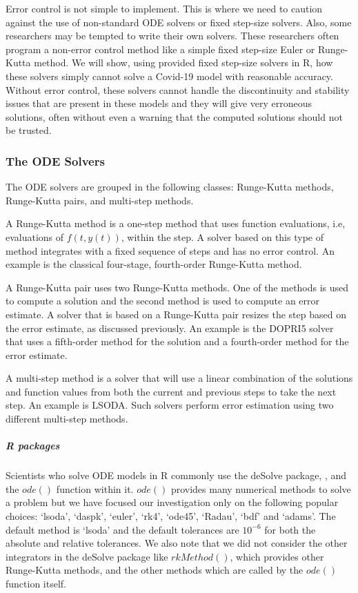 Error control is not simple to implement. This is where we need to caution against the use of non-standard ODE solvers or fixed step-size solvers. Also, some researchers may be tempted to write their own solvers. These researchers often program a non-error control method like a simple fixed step-size Euler or Runge-Kutta method. We will show, using provided fixed step-size solvers in R, how these solvers simply cannot solve a Covid-19 model with reasonable accuracy. Without error control, these solvers cannot handle the discontinuity and stability issues that are present in these models and they will give very erroneous solutions, often without even a warning that the computed solutions should not be trusted.

\subsubsection{The ODE Solvers}
\label{subsection:numerical_software_used}
The ODE solvers are grouped in the following classes: Runge-Kutta methods, Runge-Kutta pairs, and multi-step methods.

A Runge-Kutta method is a one-step method that uses function evaluations, i.e, evaluations of $f(t, y(t))$, within the step. A solver based on this type of method integrates with a fixed sequence of steps and has no error control. An example is the classical four-stage, fourth-order Runge-Kutta method.

A Runge-Kutta pair uses two Runge-Kutta methods. One of the methods is used to compute a solution and the second method is used to compute an error estimate. A solver that is based on a Runge-Kutta pair resizes the step based on the error estimate, as discussed previously. An example is the DOPRI5 solver that uses a fifth-order method for the solution and a fourth-order method for the error estimate.

A multi-step method is a solver that will use a linear combination of the solutions and function values from both the current and previous steps to take the next step. An example is LSODA. Such solvers perform error estimation using two different multi-step methods. 

\subparagraph{R packages}
Scientists who solve ODE models in R commonly use the deSolve package, \cite{soetaert2010solving}, and the $ode()$ function within it.
$ode()$ provides many numerical methods to solve a problem but we have focused our investigation only on the following popular choices: `lsoda', `daspk', `euler', `rk4', `ode45', `Radau', `bdf' and `adams'. The default method is `lsoda' and the default tolerances are $10^{-6}$ for both the absolute and relative tolerances. We also note that we did not consider the other integrators in the deSolve package like $rkMethod()$, which provides other Runge-Kutta methods, and the other methods which are called by the $ode()$ function itself.

